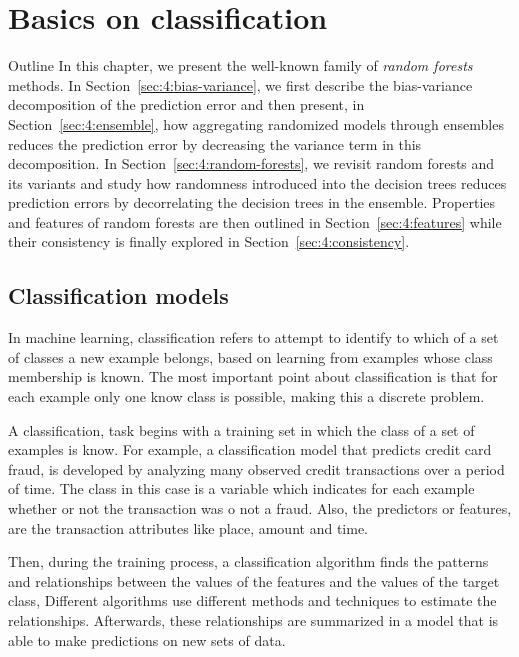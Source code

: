 \chapter{Basics on classification}

\begin{remark}{Outline}
In this chapter, we present the well-known family of \textit{random forests}
methods. In Section~\ref{sec:4:bias-variance}, we first describe the bias-variance
decomposition of the prediction error and then present, in
Section~\ref{sec:4:ensemble}, how aggregating randomized models through
ensembles reduces the prediction error by decreasing the variance term in this
decomposition. In Section~\ref{sec:4:random-forests}, we revisit random forests
and its variants and study how randomness introduced into the decision trees
reduces prediction errors by decorrelating the decision
trees in the ensemble. Properties and features of random forests are then outlined
in Section~\ref{sec:4:features} while their consistency
is finally explored in Section~\ref{sec:4:consistency}.
\end{remark}


\section{Classification models}
In machine learning, classification refers to attempt to identify to which of a set of classes a 
new example belongs, based on learning from examples whose class membership is known. The most 
important point about classification is that for each example only one know class is possible, 
making this a discrete problem. 

A classification, task begins with a training set in which the class of a set of examples is know. 
For example, a classification model that predicts credit card fraud, is developed by analyzing 
many observed credit transactions over a period of time. The class in this case is a variable which 
indicates for each example whether or not the transaction was o not a fraud. Also, the predictors 
or features, are the transaction attributes like place, amount and time.

Then, during the training process, a classification algorithm finds the patterns and relationships 
between the values of the features and the values of the target class, Different algorithms use 
different methods and techniques to estimate the relationships. Afterwards, these relationships are 
summarized in a model that is able to make predictions on new sets of data.

